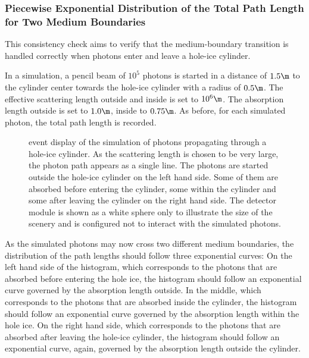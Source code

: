 

\subsubsection{Piecewise Exponential Distribution of the Total Path Length for Two Medium Boundaries}


This consistency check aims to verify that the medium-boundary transition is handled correctly when photons enter and leave a hole-ice cylinder.

In a simulation, a pencil beam of $10^5$ photons is started in a distance of $1.5\m$ to the cylinder center towards the hole-ice cylinder with a radius of $0.5\m$. The effective scattering length outside and inside is set to $10^6\m$. The absorption length outside is set to $1.0\m$, inside to $0.75\m$.
As before, for each simulated photon, the total path length is recorded.


\begin{figure}
  \caption{\steamshovel event display of the simulation of photons propagating through a hole-ice cylinder. As the scattering length is chosen to be very large, the photon path appears as a single line.  The photons are started outside the hole-ice cylinder on the left hand side. Some of them are absorbed before entering the cylinder, some within the cylinder and some after leaving the cylinder on the right hand side. The detector module is shown as a white sphere only to illustrate the size of the scenery and is configured not to interact with the simulated photons.}
\end{figure}

As the simulated photons may now cross two different medium boundaries, the distribution of the path lengths should follow three exponential curves: On the left hand side of the histogram, which corresponds to the photons that are absorbed before entering the hole ice, the histogram should follow an exponential curve governed by the absorption length outside. In the middle, which corresponds to the photons that are absorbed inside the cylinder, the histogram should follow an exponential curve governed by the absorption length within the hole ice. On the right hand side, which corresponds to the photons that are absorbed after leaving the hole-ice cylinder, the histogram should follow an exponential curve, again, governed by the absorption length outside the cylinder.

